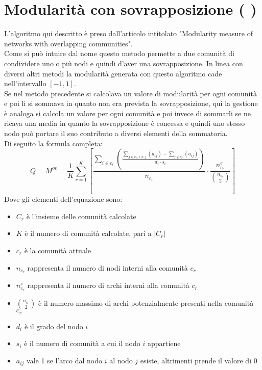 \section{Modularità con sovrapposizione ( \mover )}
L'algoritmo qui descritto è preso dall'articolo intitolato "Modularity measure of networks with overlapping communities".\\
Come si può intuire dal nome questo metodo permette a due comunità di condividere uno o più nodi e quindi d'aver una sovrapposizione. In linea con diversi altri metodi la modularità generata con questo algoritmo cade nell'intervallo $[-1, 1]$.\\
Se nel metodo precedente si calcolava un valore di modularità per ogni comunità e poi li si sommava in quanto non era prevista la sovrapposizione, qui la gestione è analoga si calcola un valore per ogni comunità e poi invece di sommarli se ne ricava una media in quanto la sovrapposizione è concessa e quindi uno stesso nodo può portare il suo contributo a diversi elementi della sommatoria.\\
Di seguito la formula completa:
\begin{equation}
	Q = M^{ov} = \frac{1}{K} 
	\sum_{r=1}^{K} \left[
		\frac
			{\sum\limits_{i \in c_r} 
				\left( \frac
					{
						\sum\limits_{j \in c_r, i \neq j} \left( a_{ij} \right) 
						- 
						\sum\limits_{j \notin c_r} \left( a_{ij} \right) 
					} 
					{d_i \cdot s_i} 
				\right) } 
			{n_{c_r}}
		\cdot
		\frac{ n^e_{c_r} }{ \binom{n_{c_r}}{2} } 
	\right]
	\label{eq:m_over}
\end{equation}
Dove gli elementi dell'equazione sono:
\begin{itemize}
	\item $C_r$ è l'insieme delle comunità calcolate
	\item $K$ è il numero di comunità calcolate, pari a $|C_r|$
	\item $c_r$ è la comunità attuale
	\item $n_{c_r}$ rappresenta il numero di nodi interni alla comunità $c_r$
	\item $n^e_{c_r}$ rappresenta il numero di archi interni alla comunità $c_r$
	\item $\binom{n_{c_r}}{2}$ è il numero massimo di archi potenzialmente presenti nella comunità $c_r$
	\item $d_i$ è il grado del nodo $i$
	\item $s_i$ è il numero di comunità a cui il nodo $i$ appartiene
	\item $a_{ij}$ vale 1 se l'arco dal nodo $i$ al nodo $j$ esiste, altrimenti prende il valore di 0
\end{itemize}
